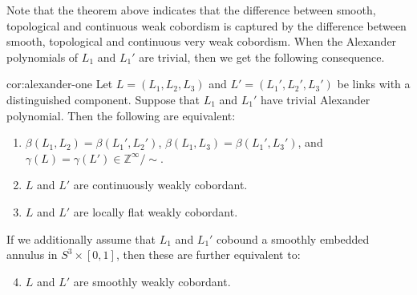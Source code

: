\documentclass[a4paper, 11pt]{amsart}
\newcommand{\red}{\textcolor{red}}
\newcommand{\chris}[1]{\red{[Chris] #1}}
\theoremstyle{definition}
\newcommand{\Z}{\mathbb{Z}}
\begin{document}


Note that the theorem above indicates that the difference between smooth, topological and continuous weak cobordism is captured by the difference between smooth, topological and continuous very weak cobordism.  When the Alexander polynomials of $L_1$ and $L_1'$ are trivial, then we get the following consequence.

 



\begin{repcorollary}{cor:alexander-one}
Let $L=(L_1,L_2,L_3)$ and $L'=(L_1',L_2',L_3')$ be links with a distinguished component. Suppose that $L_1$ and $L_1'$ have trivial Alexander polynomial. Then the following are equivalent:
\begin{enumerate}
\item \label{item: same invts}
$\beta(L_1,L_2)=\beta(L_1',L_2')$, $\beta(L_1,L_3)=\beta(L_1',L_3')$, and
$\gamma(L)=\gamma(L')\in\Z^\infty /\sim $.

\item \label{item: top weak cob}
$L$ and $L'$ are continuously weakly cobordant.

\item \label{item: LF weak cob}
$L$ and $L'$ are locally flat weakly cobordant.
\end{enumerate}
If we additionally assume that $L_1$ and $L_1'$ cobound a smoothly embedded annulus in $S^3\times[0,1]$, then these are further equivalent to:
\begin{enumerate}\setcounter{enumi}{3}
\item \label{item: smooth weak cob}
$L$ and $L'$ are smoothly weakly cobordant.
\end{enumerate}
\end{repcorollary}
\end{document}
